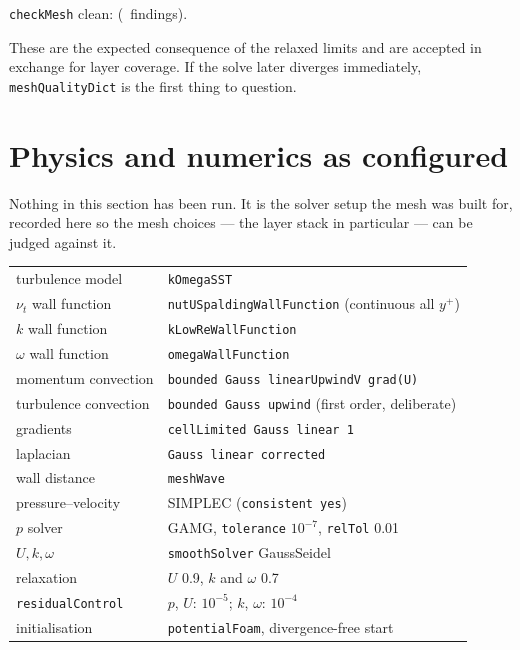 \documentclass[11pt,a4paper]{article}
\begin{document}
\texttt{checkMesh} clean: \textbf{\checkMeshOk} (\nCheckMeshFail\ findings).
\begin{itemize}
\checkmeshlist
\end{itemize}

\noindent
These are the expected consequence of the relaxed limits and are accepted in
exchange for layer coverage. If the solve later diverges immediately,
\texttt{meshQualityDict} is the first thing to question.

\section{Physics and numerics as configured}\label{sec:numerics}

Nothing in this section has been run. It is the solver setup the mesh was
built for, recorded here so the mesh choices --- the layer stack in
particular --- can be judged against it.

\begin{center}\small
\begin{tabular}{@{}ll@{}}
\toprule
turbulence model & \texttt{kOmegaSST}\\
$\nu_t$ wall function & \texttt{nutUSpaldingWallFunction} (continuous all $y^+$)\\
$k$ wall function & \texttt{kLowReWallFunction}\\
$\omega$ wall function & \texttt{omegaWallFunction}\\
\midrule
momentum convection & \texttt{bounded Gauss linearUpwindV grad(U)}\\
turbulence convection & \texttt{bounded Gauss upwind} (first order, deliberate)\\
gradients & \texttt{cellLimited Gauss linear 1}\\
laplacian & \texttt{Gauss linear corrected}\\
wall distance & \texttt{meshWave}\\
\midrule
pressure--velocity & SIMPLEC (\texttt{consistent yes})\\
$p$ solver & GAMG, \texttt{tolerance} $10^{-7}$, \texttt{relTol} 0.01\\
$U,k,\omega$ & \texttt{smoothSolver} GaussSeidel\\
relaxation & $U$ 0.9, $k$ and $\omega$ 0.7\\
\texttt{residualControl} & $p$, $U$: $10^{-5}$; $k$, $\omega$: $10^{-4}$\\
initialisation & \texttt{potentialFoam}, divergence-free start\\
\bottomrule
\end{tabular}
\end{center}
\end{document}
